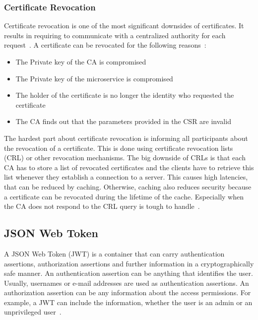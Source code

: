\subsubsection{Certificate Revocation}
Certificate revocation is one of the most significant downsides of certificates.
It results in requiring to communicate with a centralized authority for each request~\cite{dias2020microservices}.
A certificate can be revocated for the following reasons~\cite{dias2020microservices}: 
\begin{itemize}
    \item The Private key of the CA is compromised
    \item The Private key of the microservice is compromised
    \item The holder of the certificate is no longer the identity who requested the certificate 
    \item The CA finds out that the parameters provided in the CSR are invalid
\end{itemize}
The hardest part about certificate revocation is informing all participants about the revocation of a certificate.
This is done using certificate revocation lists (CRL) or other revocation mechanisms.
The big downside of CRLs is that each CA has to store a list of revocated certificates and the clients have to retrieve this list whenever they establish a connection to a server.
This causes high latencies, that can be reduced by caching.
Otherwise, caching also reduces security because a certificate can be revocated during the lifetime of the cache.
Especially when the CA does not respond to the CRL query is tough to handle~\cite{dias2020microservices}.


\subsection{JSON Web Token}
A JSON Web Token (JWT) is a container that can carry authentication assertions, authorization assertions and further information in a cryptographically safe manner.
An authentication assertion can be anything that identifies the user.
Usually, usernames or e-mail addresses are used as authentication assertions.
An authorization assertion can be any information about the access permissions.
For example, a JWT can include the information, whether the user is an admin or an unprivileged user~\cite{dias2020microservices}. 

